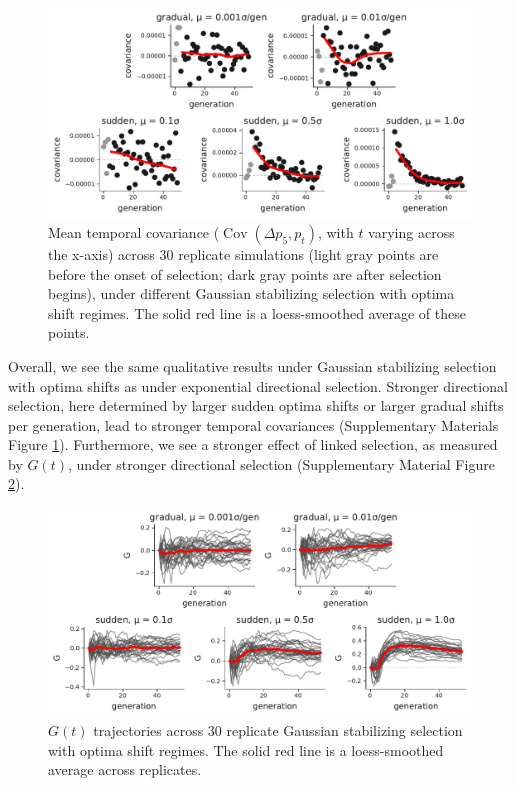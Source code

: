 \documentclass[11pt]{article}
\DeclareMathOperator{\cov}{Cov}
\begin{document}
\begin{figure}[!ht]
  \centering
  \includegraphics[width=\textwidth]{figures/gss-covs.pdf}

  \caption{Mean temporal covariance ($\cov(\Delta p_5, p_t)$, with $t$ varying
    across the x-axis) across 30 replicate simulations (light gray points are
    before the onset of selection; dark gray points are after selection
    begins), under different Gaussian stabilizing selection with optima shift
  regimes. The solid red line is a loess-smoothed average of these points.}

  \label{suppfig:gss-covs}
\end{figure}

Overall, we see the same qualitative results under Gaussian stabilizing
selection with optima shifts as under exponential directional selection.
Stronger directional selection, here determined by larger sudden optima shifts
or larger gradual shifts per generation, lead to stronger temporal covariances
(Supplementary Materials Figure \ref{suppfig:gss-covs}). Furthermore, we see a
stronger effect of linked selection, as measured by $G(t)$, under stronger
directional selection (Supplementary Material Figure \ref{suppfig:gss-G}).

\begin{figure}[!ht]
  \centering
  \includegraphics[width=\textwidth]{figures/gss-G.pdf}

  \caption{$G(t)$ trajectories across 30 replicate Gaussian stabilizing
   selection with optima shift regimes. The solid red line is a loess-smoothed
   average across replicates.}

  \label{suppfig:gss-G}
\end{figure}
\end{document}
